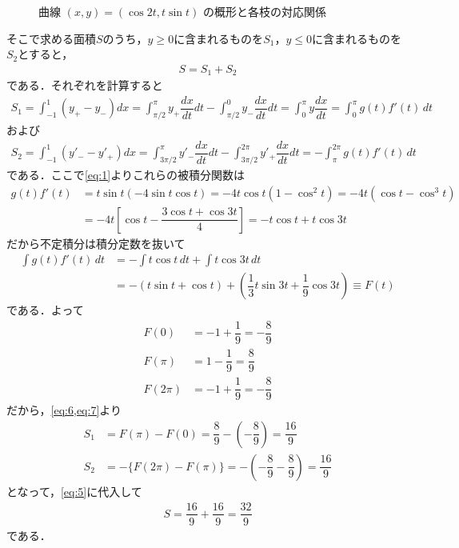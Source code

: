 \documentclass[../../main.tex]{subfiles}
\begin{document}
\begin{figure}[htb]
  \caption{曲線 $(x, y) = (\cos 2t, t\sin t)$ の概形と各枝の対応関係}
  \label{fig:parametric_curve_loops_fixed}
\end{figure}

そこで求める面積$S$のうち，$y\ge0$に含まれるものを$S_1$，$y\le0$に含まれるものを$S_2$とすると，
\begin{align}
  S=S_1+S_2 \label{eq:5}
\end{align}
である．それぞれを計算すると
\begin{align}
  S_1= \int_{-1}^{1}(y_{+}-y_{-})dx
  = \int_{\pi/2}^{\pi}y_{+}\dfrac{dx}{dt}dt - \int_{\pi/2}^{0}y_{-}\dfrac{dx}{dt}dt
  = \int_{0}^{\pi}y\dfrac{dx}{dt}
  = \int_0^\pi g(t)f'(t)\,dt \label{eq:6}
\end{align}
および
\begin{align}
  S_2= \int_{-1}^{1}(y'_{-}-y'_{+})dx
  = \int_{3\pi/2}^{\pi}y'_{-}\dfrac{dx}{dt}dt - \int_{3\pi/2}^{2\pi}y'_{+}\dfrac{dx}{dt}dt
  = -\int_{\pi}^{2\pi} g(t)f'(t)\,dt \label{eq:7}
\end{align}
である．ここで\cref{eq:1}よりこれらの被積分関数は
\begin{align}
  g(t)f'(t)
  &=t\sin t (-4\sin t\cos t)
  =-4t\cos t(1-\cos^2t)
  =-4t(\cos t-\cos^3t) \\
  &=-4t\left[\cos t - \dfrac{3\cos t+\cos 3t}{4}\right]
  =-t\cos t + t\cos 3t
\end{align}
だから不定積分は積分定数を抜いて
\begin{align}
  \int g(t)f'(t)\,dt
  &=-\int t\cos t\,dt+\int t\cos 3t\,dt\\
  &=-(t\sin t+\cos t)+\left(\dfrac{1}{3}t\sin 3t + \dfrac{1}{9}\cos 3t\right) \equiv F(t)
\end{align}
である．よって
\begin{align}
  F(0)  &=-1+\dfrac{1}{9}=-\dfrac{8}{9} \\
  F(\pi)&=1-\dfrac{1}{9}=\dfrac{8}{9} \\
  F(2\pi)&=-1+\dfrac{1}{9}=-\dfrac{8}{9}
\end{align}
だから，\cref{eq:6,eq:7}より
\begin{align}
  S_1&=F(\pi)-F(0)=\dfrac{8}{9}-\left(-\dfrac{8}{9}\right)=\dfrac{16}{9}\\
  S_2&=-\{F(2\pi)-F(\pi)\}=-\left(-\dfrac{8}{9}-\dfrac{8}{9}\right)=\dfrac{16}{9}
\end{align}
となって，\cref{eq:5}に代入して
\begin{align}
  S=\dfrac{16}{9}+\dfrac{16}{9}=\dfrac{32}{9}
\end{align}
である．
\end{document}

